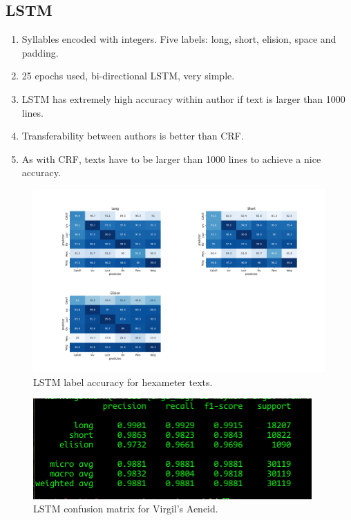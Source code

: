 \newpage
\subsection{LSTM}
\begin{enumerate}
  \item Syllables encoded with integers. Five labels: long, short, elision, space and padding.
	\item 25 epochs used, bi-directional LSTM, very simple.	
	\item LSTM has extremely high accuracy within author if text is larger than 1000 lines.
	\item Transferability between authors is better than CRF.
	\item As with CRF, texts have to be larger than 1000 lines to achieve a nice accuracy.
\end{enumerate}

\begin{figure}[H]
    \centering
    \includegraphics[width=1\textwidth]{img/lstm/lstm_hexameter_experiment.png}
    \caption{LSTM label accuracy for hexameter texts.}
    \label{fig:exp_architecture}
\end{figure}

\begin{figure}[H]
    \centering
    \includegraphics[width=0.95\textwidth]{img/lstm/lstm_confusion_matrix.png}

    \caption{LSTM confusion matrix for Virgil's Aeneid.}
    \label{fig:exp_architecture}
\end{figure}

